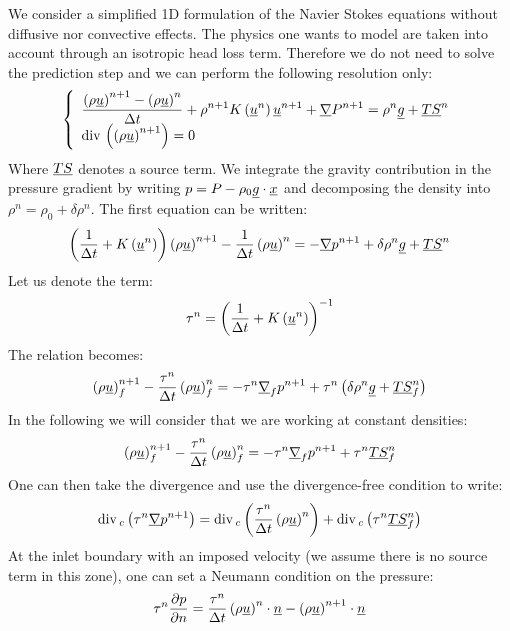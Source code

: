 We consider a simplified 1D formulation of the Navier Stokes equations without
diffusive nor convective effects. The physics one wants to model are taken into
account through an isotropic head loss term. Therefore we do not need to solve
the prediction step and we can perform the following resolution only:
\begin{equation}
    \left\lbrace\begin{array}{l}
    \displaystyle{}\frac{\left(\rho\underline{u}\right)^{n+1}-\left(\rho\underline{u}\right)^{n}}{\Delta t}+\rho^{n+1}K\left(\underline{u}^{n}\right)\underline{u}^{n+1}+\underline{\nabla} P^{n+1}=\rho^{n}\underline{g}+\underline{TS}^{n} \\
    \displaystyle{}\text{div}\,\left(\left(\rho\underline{u}\right)^{n+1}\right)=0
    \end{array}
    \right.
\end{equation}
Where $\underline{TS}$ denotes a source term. We integrate the gravity contribution
in the pressure gradient by writing $p=P-\rho_{0}\underline{g}\cdot\underline{x}$ and
decomposing the density into $\rho^{n}=\rho_{0}+\delta\rho^{n}$. The first
equation can be written:
\begin{equation}
    \left(\frac{1}{\Delta t}+K\left(\underline{u}^{n}\right)\right)\left(\rho\underline{u}\right)^{n+1}-\frac{1}{\Delta t}\left(\rho\underline{u}\right)^{n}=-\underline{\nabla} p^{n+1}+\delta\rho^{n}\underline{g}+\underline{TS}^{n}
\end{equation}
Let us denote the term:
\begin{equation}
    \tau^{n}=\left(\frac{1}{\Delta t}+K\left(\underline{u}^{n}\right)\right)^{-1}
\end{equation}
The relation becomes:
\begin{equation}
    \left(\rho\underline{u}\right)_{{f}}^{n+1}-\frac{\tau^{n}}{\Delta t}\left(\rho\underline{u}\right)_{{f}}^{n}=-\tau^{n}\underline{\nabla}_{{f}} p^{n+1}+\tau^{n}\left(\delta\rho^{n}\underline{g}+\underline{TS}_{{f}}^{n}\right)
\end{equation}
In the following we will consider that we are working at constant densities:
\begin{equation}
    \left(\rho\underline{u}\right)_{{f}}^{n+1}-\frac{\tau^{n}}{\Delta t}\left(\rho\underline{u}\right)_{{f}}^{n}=-\tau^{n}\underline{\nabla}_{{f}} p^{n+1}+\tau^{n}\underline{TS}_{{f}}^{n}
\end{equation}
One can then take the divergence and use the divergence-free condition to
write:
\begin{equation}
    \text{div}\,_{c}\left(\tau^{n}\underline{\nabla} p^{n+1}\right)=\text{div}\,_{c}\left(\frac{\tau^{n}}{\Delta t}\left(\rho\underline{u}\right)^{n}\right)+\text{div}\,_{c}\left(\tau^{n}\underline{TS}_{{f}}^{n}\right)
\end{equation}
At the inlet boundary with an imposed velocity (we assume there is no source
term in this zone), one can set a Neumann condition on the pressure:
\begin{equation}
    \tau^{n}\frac{\partial p}{\partial n}=\frac{\tau^{n}}{\Delta t}\left(\rho\underline{u}\right)^{n}\cdot\underline{n}-\left(\rho\underline{u}\right)^{n+1}\cdot\underline{n}
\end{equation}

